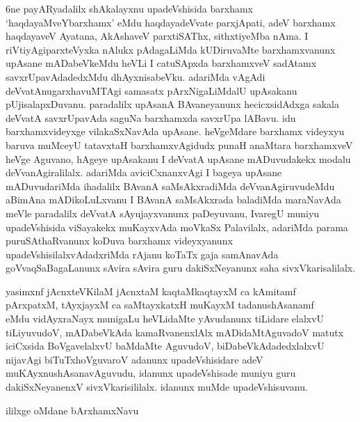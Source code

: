 \begin{artha}
6ne payARyadalilx shAkalayxnu upadeVshisida barxhamx `haqdayaMveY\-barxhamx' eMdu haqdayadeVvate parxjApati, adeV barxhamx haqdayaveV Ayatana, AkAshaveV parxtiSAThx, sithxtiyeMba nAma. I riVtiyAgi\break parxteVyxka nAlukx pAdagaLiMda kUDiruvaMte barxhamxvanunx upAsane mADabeVkeMdu heVLi I catuSApxda barxhamxveV sadAtamx savxrUpavAdadedxMdu dhAyxnisabeVku. adariMda vAgAdi deVvatAnugarxhavuMTAgi samasatx pArxNigaLiMdalU upAsakanu pUjisalapxDuvanu. paradalilx upAsanA BAvaneyanunx hecicxsidAdxga sakala deVvatA savxrUpavAda saguNa barxhamxda savxrUpa lABavu. idu barxhamxvideyxge vilakaSxNavAda upAsane. heVgeMdare barxhamx videyxyu baruva muMceyU tatavxtaH barxhamxvAgidudx punaH anaMtara barxhamxveV heVge Aguvano, hAgeye upAsakanu I deVvatA upAsane mADuvudakekx modalu deVvanAgiralilalx. adariMda aviciCxnanxvAgi I bageya upAsane mADuvudariMda ihadalilx BAvanA saMsAkxradiMda deVvanAgiruvudeMdu aBimAna mADikoLuLxvanu I BAvanA saMsAkxrada baladiMda maraNavAda meVle paradalilx deVvatA sAyujayxvanunx paDeyuvanu, IvaregU muniyu upadeVshisida viSayakekx muKayxvAda moVkaSx Palavilalx, adariMda parama puruSAthaRvanunx koDuva barxhamx videyxyanunx upadeVshisilalxvAdadxriMda rAjanu koTaTx gaja samAnavAda goVvaqSaBagaLanunx sAvira sAvira guru dakiSxNeyanunx saha sivxVkarisalilalx. 
\end{artha}%


\begin{artha}
\noindent 
yasimxnf jAcnxteV\s KilaM jAcnxtaM kaqtaMkaqtayxM ca kAmitamf \\
pArxpatxM, tAyxjayxM ca saMtayxkatxH muKayxM tadanushAsanamf \\
eMdu vidAyxraNayx munigaLu heVLidaMte yAvudanunx tiLidare elalxvU tiLiyuvudoV, mADabeVkAda kamaRvanenxlAlx mADidaMtAguvadoV matutx iciCxsida BoVgavelalxvU baMdaMte AguvudoV, biDabeVkA\-\break dadedxlalxvU nijavAgi biTuTxhoVguvaroV adanunx upadeVshisidare adeV muKAyxnushAsanavAguvudu, idanunx upadeVshisade muniyu guru dakiSxNeyanenxV sivxVkarisililalx. idanunx muMde upadeVshisuvanu. 
\end{artha}

\begin{center}
ililxge oMdane bArxhamxNavu
\end{center}



